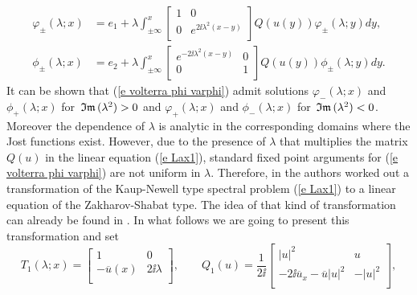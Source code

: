 \begin{equation}\label{e volterra phi varphi}
    \begin{aligned}
        \varphi_{\pm}(\lambda;x)&=e_1 + \lambda \int_{\pm\infty}^x
        \left[
          \begin{array}{cc}
            1 & 0 \\
            0 & e^{2\ii\lambda^2(x-y)} \\
          \end{array}
        \right]
        Q(u(y))\varphi_{\pm}(\lambda;y)dy,\\
        \phi_{\pm}(\lambda;x)&=e_2 + \lambda \int_{\pm\infty}^x
        \left[
          \begin{array}{cc}
            e^{-2\ii\lambda^2(x-y)} & 0 \\
            0 & 1\\
          \end{array}
        \right]
        Q(u(y))\phi_{\pm}(\lambda;y)dy.
    \end{aligned}
\end{equation}
It can be shown that (\ref{e volterra phi varphi}) admit solutions $\varphi_-(\lambda;x)$ and $\phi_+(\lambda;x)$ for $\,\mathfrak{Im}\,(\lambda^2)>0$ and $\varphi_+(\lambda;x)$ and $\phi_-(\lambda;x)$ for $\,\mathfrak{Im}\,(\lambda^2)<0$. Moreover the dependence of $\lambda$ is analytic in the corresponding domains where the Jost functions exist.
However, due to the presence of $\lambda$ that multiplies the matrix $Q(u)$ in the linear equation (\ref{e Lax1}), standard fixed point arguments for (\ref{e volterra phi varphi}) are not uniform in $\lambda$. Therefore, in \cite{Pelinovsky2016} the authors worked out a transformation of the Kaup-Newell type spectral problem (\ref{e Lax1}) to a linear equation of the Zakharov-Shabat type. The idea of that kind of transformation can already be found in \cite{KaupNewell1978}. In what follows we are going to present this transformation and set
\begin{equation}\label{e def T1 Q1}
    T_1(\lambda;x)=
    \left[
      \begin{array}{cc}
        1 & 0 \\
        -\overline{u}(x) & 2\ii\lambda \\
      \end{array}
    \right],\qquad
    Q_1(u)=\frac{1}{2\ii}
    \left[
      \begin{array}{cc}
        |u|^2 & u \\
        -2\ii\overline{u}_x -\overline{u}|u|^2& -|u|^2 \\
      \end{array}
    \right],
\end{equation}
